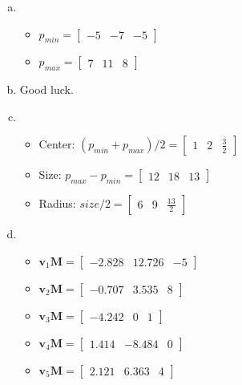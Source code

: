 \documentclass[11pt]{article}
\begin{document}
\begin{enumerate}[a.]
	\item %
		\begin{itemize}
			\item $p_{min}=\begin{bmatrix}
				-5 & -7 & -5
			\end{bmatrix}$
			\item $p_{max}=\begin{bmatrix}
				7 & 11 & 8
			\end{bmatrix}$
		\end{itemize}
	\item %
		Good luck.
	\item %
		\begin{itemize}
			\item Center: $(p_{min}+p_{max})/2 = \begin{bmatrix}
				1 & 2  & \frac{3}{2}
			\end{bmatrix}$
			\item Size: $p_{max} - p_{min} = \begin{bmatrix}
				12 & 18 & 13
			\end{bmatrix}$
			\item Radius: $size/2 = \begin{bmatrix}
				6 & 9 & \frac{13}{2}
			\end{bmatrix}$
		\end{itemize}
	\item %
		\begin{itemize}
			\item $\textbf{v}_1\textbf{M}=\begin{bmatrix}
				-2.828 & 12.726 & -5
			\end{bmatrix}$
			\item $\textbf{v}_2\textbf{M}=\begin{bmatrix}
				-0.707 & 3.535 & 8
			\end{bmatrix}$
			\item $\textbf{v}_3\textbf{M}=\begin{bmatrix}
				-4.242 & 0 & 1
			\end{bmatrix}$
			\item $\textbf{v}_4\textbf{M}=\begin{bmatrix}
				1.414 & -8.484 & 0
			\end{bmatrix}$
			\item $\textbf{v}_5\textbf{M}=\begin{bmatrix}
				2.121 & 6.363 & 4
			\end{bmatrix}$

\end{itemize}
\end{enumerate}
\end{document}
